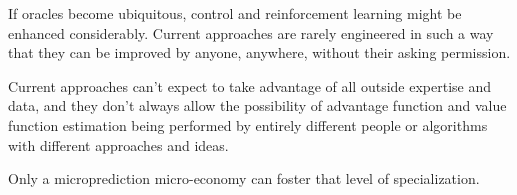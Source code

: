 If oracles become ubiquitous, control and reinforcement learning might be enhanced considerably. Current approaches are rarely engineered in such a way that they can be improved by anyone, anywhere, without their asking permission. 

Current approaches can't expect to take advantage of all outside expertise and data, and they don't always allow the possibility of advantage function and value function estimation being performed by entirely different people or algorithms with different approaches and ideas. 

Only a microprediction micro-economy can foster that level of specialization. 







































